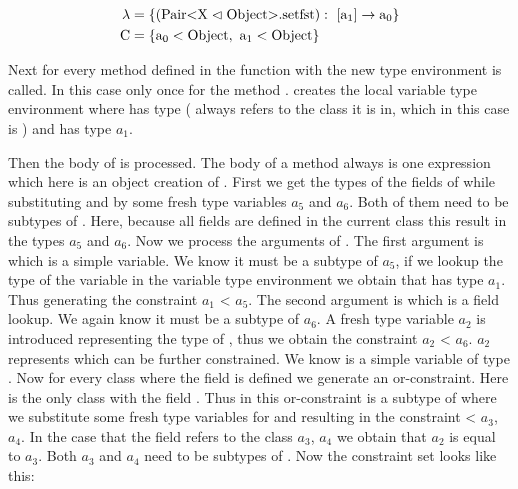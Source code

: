 \begin{align*}
    \lambda &= \{ ( \text{Pair} \text{<} \text{X} \vartriangleleft \text{Object} \text{>}. \text{setfst} ): \ [\text{a}_1] \to \text{a}_0 \}\\
    \text{C} &= \{ \text{a}_0 < \text{Object}, \ \text{a}_1 < \text{Object} \}\\
\end{align*}

Next for every method defined in  the function  with the new type environment is called.
In this case only once for the method .  creates the local variable type environment where  has type  ( always refers to the class it is in, which in this case is ) and  has type $a_1$.

Then the body of  is processed. The body of a method always is one expression which here is an object creation of .
First we get the types of the fields of  while substituting  and  by some fresh type variables $a_5$ and $a_6$. Both of them need to be subtypes of . Here, because all fields are defined in the current class this result in the types $a_5$ and $a_6$. Now we process the arguments of .
The first argument is  which is a simple variable. We know it must be a subtype of $a_5$, if we lookup the type of the variable  in the variable type environment we obtain that  has type $a_1$. Thus generating the constraint $a_1$ < $a_5$.
The second argument is  which is a field lookup. We again know it must be a subtype of $a_6$. A fresh type variable $a_2$ is introduced representing the type of , thus we obtain the constraint $a_2$ < $a_6$.
$a_2$ represents  which can be further constrained. We know  is a simple variable of type .
Now for every class where the field  is defined we generate an or-constraint. Here  is the only class with the field . Thus in this or-constraint  is a subtype of  where we substitute some fresh type variables for  and  resulting in the constraint  < $a_3$, $a_4$\inl{>}.
In the case that the field  refers to the class $a_3$, $a_4$\inl{>} we obtain that $a_2$ is equal to $a_3$. Both $a_3$ and $a_4$ need to be subtypes of .
Now the constraint set looks like this:

